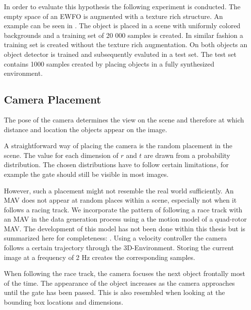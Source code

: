 In order to evaluate this hypothesis the following experiment is conducted. The empty space of an \ac{EWFO} is augmented with a texture rich structure. An example can be seen in . The object is placed in a scene with uniformly colored backgrounds and a training set of 20 000 samples is created. In similar fashion a training set is created without the texture rich augmentation. On both objects an object detector is trained and subsequently evaluted in a test set. The test set contains 1000 samples created by placing objects in a fully synthesized environment.


\subsection{Camera Placement}

The pose of the camera determines the view on the scene and therefore at which distance and location the objects appear on the image.
	
A straightforward way of placing the camera is the random placement in the scene. The value for each dimension of $r$ and $t$ are drawn from a probability distribution. The chosen distributions have to follow certain limitations, for example the gate should still be visible in most images.

However, such a placement might not resemble the real world sufficiently. An \ac{MAV} does not appear at random places within a scene, especially not when it follows a racing track. We incorporate the pattern of following a race track with an \ac{MAV} in the data generation process using a the motion model of a quad-rotor \ac{MAV}. The development of this model has not been done within this thesis but is summarized here for completeness: . Using a velocity controller the camera follows a certain trajectory through the 3D-Environment. Storing the current image at a frequency of 2 Hz creates the corresponding samples.

When following the race track, the camera focuses the next object frontally most of the time. The appearance of the object increases as the camera approaches until the gate has been passed. This is also resembled when looking at the bounding box locations and dimensions.

